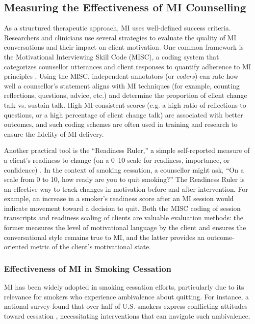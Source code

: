 \subsection{Measuring the Effectiveness of MI Counselling}
As a structured therapeutic approach, MI uses well-defined success criteria. Researchers and clinicians use several strategies to evaluate the quality of MI conversations and their impact on client motivation. One common framework is the Motivational Interviewing Skill Code (MISC), a coding system that categorizes counsellor utterances and client responses to quantify adherence to MI principles \cite{Houck2010}. Using the MISC, independent annotators (or \emph{coders})  can rate how well a counsellor's statement aligns with MI techniques (for example, counting reflections, questions, advice, etc.) and determine the proportion of client change talk vs. sustain talk. High MI-consistent scores (e.g. a high ratio of reflections to questions, or a high percentage of client change talk) are associated with better outcomes, and such coding schemes are often used in training and research to ensure the fidelity of MI delivery.

Another practical tool is the ``Readiness Ruler,'' a simple self-reported measure of a client’s readiness to change (on a 0–10 scale for readiness, importance, or confidence) \cite{Boudreaux2012}. In the context of smoking cessation, a counsellor might ask, ``On a scale from 0 to 10, how ready are you to quit smoking?'' The Readiness Ruler is an effective way to track changes in motivation before and after intervention. For example, an increase in a smoker's readiness score after an MI session would indicate movement toward a decision to quit. Both the MISC coding of session transcripts and readiness scaling of clients are valuable evaluation methods: the former measures the level of motivational language by the client and ensures the conversational style remains true to MI, and the latter provides an outcome-oriented metric of the client’s motivational state.

\subsubsection{Effectiveness of MI in Smoking Cessation}
 MI has been widely adopted in smoking cessation efforts, particularly due to its relevance for smokers who experience ambivalence about quitting. For instance, a national survey found that over half of U.S. smokers express conflicting attitudes toward cessation \cite{Babb2017}, necessitating interventions that can navigate such ambivalence.

